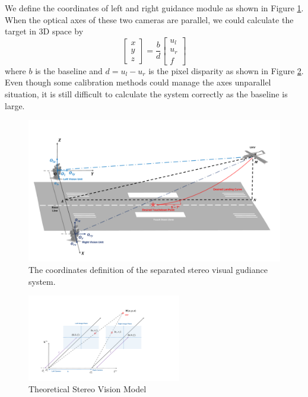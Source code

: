 \documentclass[journal,article,submit,moreauthors,pdftex,10pt,a4paper]{mdpi}
\begin{document}
We define the coordinates of left and right guidance module as shown in Figure \ref{fig:Fig04_GeneralSystem}. When the optical axes of these two cameras are parallel, we could calculate the target in 3D space by
\begin{equation}
	\left[ {\begin{array}{*{20}{c}}
			x \\ 
			y \\ 
			z 
	\end{array}} \right] =\frac{b}{d} \left[ {\begin{array}{*{20}{c}}
			u_l \\ 
			u_r \\ 
			f 
	\end{array}} \right]
\end{equation}
where $b$ is the baseline and $d=u_l-u_r$ is the pixel disparity as shown in Figure \ref{fig:chp03_vision_20_basic_stereo}. Even though some calibration methods could manage the axes unparallel situation, it is still difficult to calculate the system correctly as the baseline is large.
\begin{figure}[!t]
	\centering
	\includegraphics[width=\textwidth]{Figs/Fig04_GeneralSystem.pdf}
	\caption{The coordinates definition of the separated stereo visual gudiance system.}
	\label{fig:Fig04_GeneralSystem}
\end{figure}

\begin{figure}[!t]
	\centering
	\includegraphics[width=0.6\textwidth]{figs/chp03_vision_20_basic_stereo.pdf}	
	\caption{Theoretical Stereo Vision Model}
	\label{fig:chp03_vision_20_basic_stereo}
\end{figure}
\end{document}
